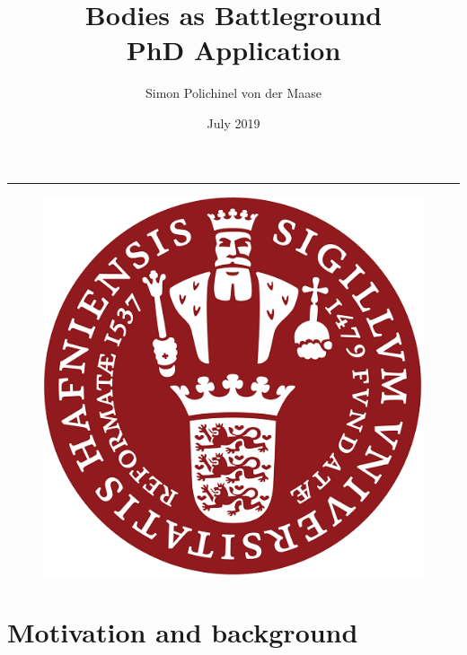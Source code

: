 \documentclass[a4paper]{article}
\title{\textbf{Bodies as Battleground} \\ PhD Application}
\author{Simon Polichinel von der Maase}
\date{July 2019}
\begin{document}
	\begin{titlepage}
		\maketitle
		\noindent\rule{\linewidth}{0.4pt}
		\begin{figure}[h]
			\centering
			\includegraphics[scale=0.32]{KU_logo.png}
		\end{figure}
		\thispagestyle{empty} %
	\end{titlepage}
    \tableofcontents
\pagebreak


\section{Motivation and background} 

\end{document}

